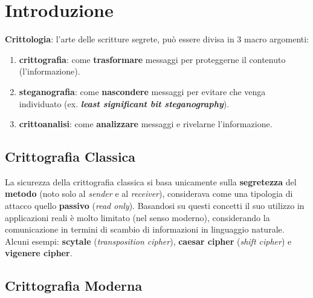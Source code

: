 \chapter{Introduzione}
\textbf{Crittologia}: l'arte delle scritture segrete, può essere divisa in 3 macro argomenti:
\begin{enumerate}[nosep]
    \item \textbf{crittografia}: come \textbf{trasformare} messaggi per proteggerne il contenuto (l'informazione).
    \item \textbf{steganografia}: come \textbf{nascondere} messaggi per evitare che venga individuato (ex. \textbf{\textit{least significant bit steganography}}).
    \item \textbf{crittoanalisi}: come \textbf{analizzare} messaggi e rivelarne l'informazione.   
\end{enumerate}

\section{Crittografia Classica}
La sicurezza della crittografia classica si basa unicamente sulla \textbf{segretezza} del \textbf{metodo} (noto solo al \textit{sender} e al \textit{receiver}), considerava come una tipologia di attacco quello \textbf{passivo} (\textit{read only}). Basandosi su questi concetti il suo utilizzo in applicazioni reali è molto limitato (nel senso moderno), considerando la comunicazione in termini di scambio di informazioni in linguaggio naturale. \\
Alcuni esempi: \textbf{scytale} (\textit{transposition cipher}), \textbf{caesar cipher} (\textit{shift cipher}) e \textbf{vigenere cipher}.

\newpage
\section{Crittografia Moderna}
